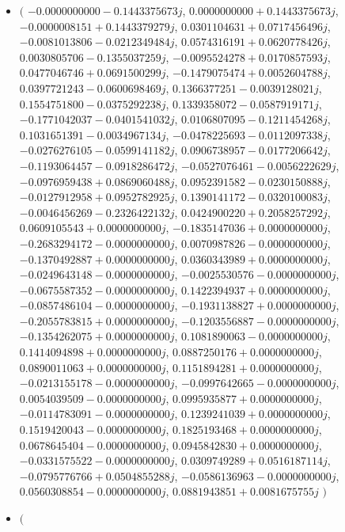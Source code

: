 \documentclass[14pt,a4paper]{article}
\begin{document}
\begin{itemize}
\item
$\big($
$-0.0000000000-0.1443375673j$, $0.0000000000+0.1443375673j$, $-0.0000008151+0.1443379279j$, $0.0301104631+0.0717456496j$, $-0.0081013806-0.0212349484j$, $0.0574316191+0.0620778426j$, $0.0030805706-0.1355037259j$, $-0.0095524278+0.0170857593j$, $0.0477046746+0.0691500299j$, $-0.1479075474+0.0052604788j$, $0.0397721243-0.0600698469j$, $0.1366377251-0.0039128021j$, $0.1554751800-0.0375292238j$, $0.1339358072-0.0587919171j$, $-0.1771042037-0.0401541032j$, $0.0106807095-0.1211454268j$, $0.1031651391-0.0034967134j$, $-0.0478225693-0.0112097338j$, $-0.0276276105-0.0599141182j$, $0.0906738957-0.0177206642j$, $-0.1193064457-0.0918286472j$, $-0.0527076461-0.0056222629j$, $-0.0976959438+0.0869060488j$, $0.0952391582-0.0230150888j$, $-0.0127912958+0.0952782925j$, $0.1390141172-0.0320100083j$, $-0.0046456269-0.2326422132j$, $0.0424900220+0.2058257292j$, $0.0609105543+0.0000000000j$, $-0.1835147036+0.0000000000j$, $-0.2683294172-0.0000000000j$, $0.0070987826-0.0000000000j$, $-0.1370492887+0.0000000000j$, $0.0360343989+0.0000000000j$, $-0.0249643148-0.0000000000j$, $-0.0025530576-0.0000000000j$, $-0.0675587352-0.0000000000j$, $0.1422394937+0.0000000000j$, $-0.0857486104-0.0000000000j$, $-0.1931138827+0.0000000000j$, $-0.2055783815+0.0000000000j$, $-0.1203556887-0.0000000000j$, $-0.1354262075+0.0000000000j$, $0.1081890063-0.0000000000j$, $0.1414094898+0.0000000000j$, $0.0887250176+0.0000000000j$, $0.0890011063+0.0000000000j$, $0.1151894281+0.0000000000j$, $-0.0213155178-0.0000000000j$, $-0.0997642665-0.0000000000j$, $0.0054039509-0.0000000000j$, $0.0995935877+0.0000000000j$, $-0.0114783091-0.0000000000j$, $0.1239241039+0.0000000000j$, $0.1519420043-0.0000000000j$, $0.1825193468+0.0000000000j$, $0.0678645404-0.0000000000j$, $0.0945842830+0.0000000000j$, $-0.0331575522-0.0000000000j$, $0.0309749289+0.0516187114j$, $-0.0795776766+0.0504855288j$, $-0.0586136963-0.0000000000j$, $0.0560308854-0.0000000000j$, $0.0881943851+0.0081675755j$
$\big)$
\item
$\big($

\end{itemize}
\end{document}
